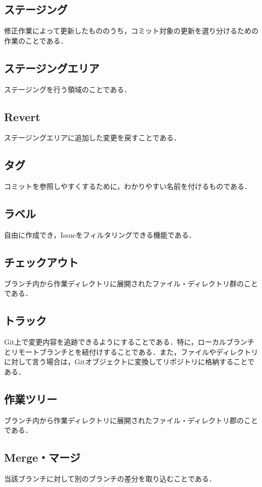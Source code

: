 \subsection{ステージング}
修正作業によって更新したもののうち，コミット対象の更新を選り分けるための作業のことである．

\subsection{ステージングエリア}
ステージングを行う領域のことである．

\subsection{Revert}
ステージングエリアに追加した変更を戻すことである．

\subsection{タグ}
コミットを参照しやすくするために，わかりやすい名前を付けるものである．

\subsection{ラベル}
自由に作成でき，Issueをフィルタリングできる機能である．

\newpage

\subsection{チェックアウト}
ブランチ内から作業ディレクトリに展開されたファイル・ディレクトリ群のことである．

\subsection{トラック}
Git上で変更内容を追跡できるようにすることである．特に，ローカルブランチとリモートブランチとを紐付けすることである．また，ファイルやディレクトリに対して言う場合は，Gitオブジェクトに変換してリポジトリに格納することである．

\subsection{作業ツリー}
ブランチ内から作業ディレクトリに展開されたファイル・ディレクトリ郡のことである．

\subsection{Merge・マージ}
当該ブランチに対して別のブランチの差分を取り込むことである．

